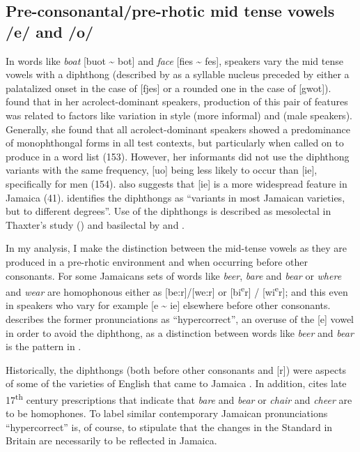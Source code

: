\subsection{Pre-consonantal\slash pre-rhotic mid tense vowels /e/ and /o/}%
In words like \textit{boat} [buot {\textasciitilde} bot] and \textit{face} [fies {\textasciitilde} fes], speakers vary the mid tense vowels with a diphthong (described by \citealt[8]{DevonishSeiler1991} as a syllable nucleus preceded by either a palatalized onset in the case of [fjes] or a rounded one in the case of [gwot]).  \citet{BeckfordWassink2001} found that in her acrolect-dominant speakers, production of this pair of features was related to factors like variation in style (more informal) and  (male speakers).  Generally, she found that all acrolect-dominant speakers showed a predominance of monophthongal forms in all test contexts, but particularly when called on to produce  in a word list (153).  However, her informants did not use the diphthong variants with the same frequency, [uo] being less likely to occur than [ie], specifically for men (154).  \citet{Alleyne1980a} also suggests that [ie] is a more widespread feature in Jamaica (41).  \citet[113]{Meade2001} identifies the diphthongs as “variants in most Jamaican varieties, but to different degrees”.  Use of the diphthongs is described as mesolectal in Thaxter's study (\citeyear[239]{Thaxter1977}) and basilectal by \citet[25]{Akers1981} and \citet[576]{Wells1982c}. 

In my analysis, I make the distinction between the mid-tense vowels as they are produced in a pre-rhotic environment and when occurring before other consonants.  For some Jamaicans sets of words like \textit{beer}, \textit{bare} and \textit{bear} or \textit{where} and \textit{wear} are homophonous either as [be:r]\slash [we:r] or [bi\textsuperscript{e}r] / [wi\textsuperscript{e}r]; and this even in speakers who vary for example [e {\textasciitilde} ie] elsewhere before other consonants.  \citet[19]{Christie2003} describes the former pronunciations as “hypercorrect”, an overuse of the [e] vowel in order to avoid the  diphthong, as a distinction between words like \textit{beer} and \textit{bear} is the pattern in .  

Historically, the diphthongs (both before other consonants and [r]) were aspects of some of the varieties of English that came to Jamaica \citep[xlvi]{Cassidy1967}.  In addition, \citet[356]{Freeborn1998} cites late 17\textsuperscript{th} century prescriptions that indicate that \textit{bare} and \textit{bear} or \textit{chair} and \textit{cheer} are to be homophones.  To label similar contemporary Jamaican pronunciations “hypercorrect” is, of course, to stipulate that the changes in the Standard in Britain are necessarily to be reflected in Jamaica.   

